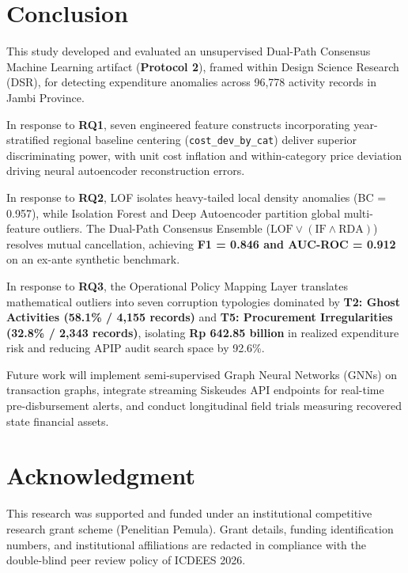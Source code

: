 \documentclass[conference]{IEEEtran}
\begin{document}
\section{Conclusion}

This study developed and evaluated an unsupervised Dual-Path Consensus Machine Learning artifact (\textbf{Protocol 2}), framed within Design Science Research (DSR), for detecting expenditure anomalies across 96,778 activity records in Jambi Province.

In response to \textbf{RQ1}, seven engineered feature constructs incorporating year-stratified regional baseline centering (\texttt{cost\_dev\_by\_cat}) deliver superior discriminating power, with unit cost inflation and within-category price deviation driving neural autoencoder reconstruction errors.

In response to \textbf{RQ2}, LOF isolates heavy-tailed local density anomalies (BC = 0.957), while Isolation Forest and Deep Autoencoder partition global multi-feature outliers. The Dual-Path Consensus Ensemble ($\text{LOF} \lor (\text{IF} \land \text{RDA})$) resolves mutual cancellation, achieving \textbf{F1 = 0.846 and AUC-ROC = 0.912} on an ex-ante synthetic benchmark.

In response to \textbf{RQ3}, the Operational Policy Mapping Layer translates mathematical outliers into seven corruption typologies dominated by \textbf{T2: Ghost Activities (58.1\% / 4,155 records)} and \textbf{T5: Procurement Irregularities (32.8\% / 2,343 records)}, isolating \textbf{Rp 642.85 billion} in realized expenditure risk and reducing APIP audit search space by 92.6\%.

Future work will implement semi-supervised Graph Neural Networks (GNNs) on transaction graphs, integrate streaming Siskeudes API endpoints for real-time pre-disbursement alerts, and conduct longitudinal field trials measuring recovered state financial assets.

\section*{Acknowledgment}
This research was supported and funded under an institutional competitive research grant scheme (Penelitian Pemula). Grant details, funding identification numbers, and institutional affiliations are redacted in compliance with the double-blind peer review policy of ICDEES 2026.
\end{document}
